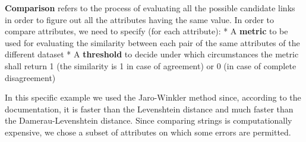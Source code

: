 \documentclass{article}
\begin{document}
\textbf{Comparison} refers to the process of evaluating all the possible
candidate links in order to figure out all the attributes having the
same value. In order to compare attributes, we need to specify (for each
attribute): * A \textbf{metric} to be used for evaluating the similarity
between each pair of the same attributes of the different dataset * A
\textbf{threshold} to decide under which circumstances the metric shall
return 1 (the similarity is 1 in case of agreement) or 0 (in case of
complete disagreement)

    In this specific example we used the Jaro-Winkler method since,
according to the documentation, it is faster than the Levenshtein
distance and much faster than the Damerau-Levenshtein distance. Since
comparing strings is computationally expensive, we chose a subset of
attributes on which some errors are permitted.
\end{document}
